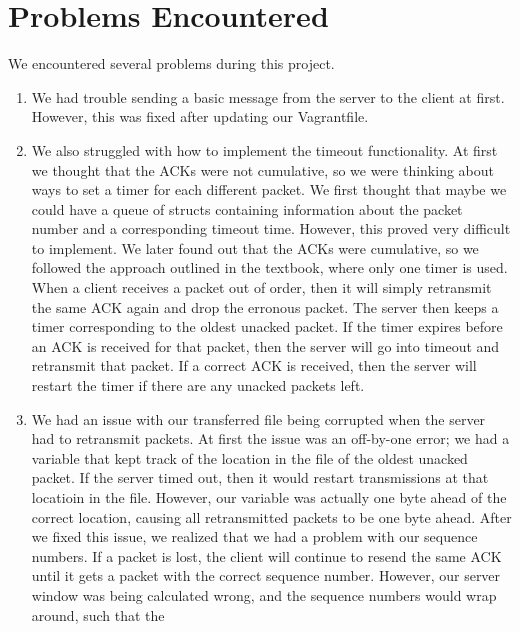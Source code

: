 \documentclass{article}
\begin{document}
\section{Problems Encountered}
    We encountered several problems during this project. 
    \begin{enumerate}
        \item We had trouble sending a basic message from the server to the
            client at first. However, this was fixed after updating our
            Vagrantfile.
        \item We also struggled with how to implement the timeout
            functionality. At first we thought that the ACKs were not
            cumulative, so we were thinking about ways to set a timer for each
            different packet. We first thought that maybe we could have a queue
            of structs containing information about the packet number and a
            corresponding timeout time. However, this proved very difficult to
            implement. We later found out that the ACKs were cumulative, so we
            followed the approach outlined in the textbook, where only one
            timer is used. When a client receives a packet out of order, then
            it will simply retransmit the same ACK again and drop the erronous
            packet. The server then keeps a timer corresponding to the oldest
            unacked packet. If the timer expires before an ACK is received for
            that packet, then the server will go into timeout and retransmit
            that packet. If a correct ACK is received, then the server will
            restart the timer if there are any unacked packets left.
        \item We had an issue with our transferred file being corrupted when
        	the server had to retransmit packets. At first the issue was an
        	off-by-one error; we had a variable that kept track of the location
        	in the file of the oldest unacked packet. If the server timed out,
        	then it would restart transmissions at that locatioin in the file.
        	However, our variable was actually one byte ahead of the correct
        	location, causing all retransmitted packets to be one byte ahead.
        	After we fixed this issue, we realized that we had a problem with
        	our sequence numbers. If a packet is lost, the client will continue
        	to resend the same ACK until it gets a packet with the correct
        	sequence number. However, our server window was being calculated
        	wrong, and the sequence numbers would wrap around, such that the

\end{enumerate}
\end{document}
